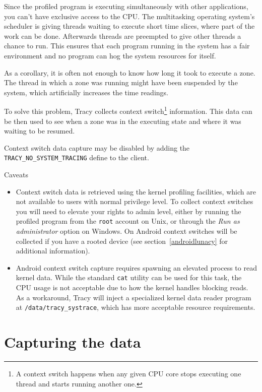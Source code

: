 \documentclass[hidelinks,titlepage,a4paper]{article}
\begin{document}
Since the profiled program is executing simultaneously with other applications, you can't have exclusive access to the CPU. The multitasking operating system's scheduler is giving threads waiting to execute short time slices, where part of the work can be done. Afterwards threads are preempted to give other threads a chance to run. This ensures that each program running in the system has a fair environment and no program can hog the system resources for itself.

As a corollary, it is often not enough to know how long it took to execute a zone. The thread in which a zone was running might have been suspended by the system, which artificially increases the time readings.

To solve this problem, Tracy collects context switch\footnote{A context switch happens when any given CPU core stops executing one thread and starts running another one.} information. This data can be then used to see when a zone was in the executing state and where it was waiting to be resumed.

Context switch data capture may be disabled by adding the \texttt{TRACY\_NO\_SYSTEM\_TRACING} define to the client.

\begin{bclogo}[
noborder=true,
couleur=black!5,
logo=\bcattention
]{Caveats}
\begin{itemize}
\item Context switch data is retrieved using the kernel profiling facilities, which are not available to users with normal privilege level. To collect context switches you will need to elevate your rights to admin level, either by running the profiled program from the \texttt{root} account on Unix, or through the \emph{Run as administrator} option on Windows. On Android context switches will be collected if you have a rooted device (see section~\ref{androidlunacy} for additional information).
\item Android context switch capture requires spawning an elevated process to read kernel data. While the standard \texttt{cat} utility can be used for this task, the CPU usage is not acceptable due to how the kernel handles blocking reads. As a workaround, Tracy will inject a specialized kernel data reader program at \texttt{/data/tracy\_systrace}, which has more acceptable resource requirements.
\end{itemize}
\end{bclogo}

\section{Capturing the data}
\label{capturing}
\end{document}
